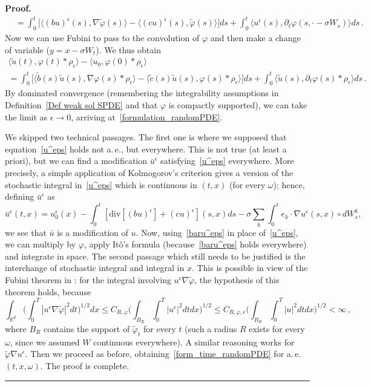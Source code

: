 \documentclass[a4paper,10pt]{article}
\newenvironment{proof}[1][Proof]{\noindent\textbf{#1.} }{\ \rule{0.5em}{0.5em}}
\newcommand{\mr}{\mathbb{R}}
\newcommand{\lan}{\langle}
\newcommand{\ran}{\rangle}
\newcommand{\diverg}{\mathrm{div}}
\newcommand{\td}{\tilde}
\newcommand{\eps}{\epsilon}
\begin{document}
\begin{proof}
\begin{align*}
&= \int^t_0 \big[\lan (b u)^\epsilon(s),\nabla\td{\varphi}(s)\ran-\lan (c u)^\epsilon(s),\td{\varphi}(s)\ran \big] ds+ \int^t_0\lan u^\epsilon(s),\partial_t\varphi(s,\cdot- \sigma W_s)\ran ds \,.
\end{align*}
Now we can use Fubini to pass to the convolution of $\varphi$ and then make a change of variable ($y=x-\sigma W_t$). We thus obtain
\begin{multline}
\label{form_time_randomPDE}
\lan \td{u}(t),\varphi(t)*\rho_\eps\ran-\lan u_0,\varphi(0)*\rho_\eps\ran \\
= \int^t_0 \big[\lan \td{b}(s)\td{u}(s),\nabla\varphi(s)*\rho_\eps\ran-\lan \td{c}(s)\td{u}(s),\varphi(s)*\rho_\eps\ran\big] ds+ \int^t_0\lan \td{u}(s),\partial_t\varphi(s)*\rho_\eps\ran ds \,.
\end{multline}
By dominated convergence (remembering the integrability assumptions in Definition~\ref{Def weak sol SPDE} and that $\varphi$ is compactly supported), we can take the limit as $\eps\rightarrow0$, arriving at~\eqref{formulation_randomPDE}.

We skipped two technical passages. The first one is where we supposed that equation~\eqref{u^eps} holds not a.\,e., but everywhere. This is not true (at least a priori), but we can find a modification $\bar{u}^\eps$ satisfying~\eqref{u^eps} everywhere. More precisely, a simple application of Kolmogorov's criterion gives a version of the stochastic integral in~\eqref{u^eps} which is continuous in $(t,x)$ (for every $\omega$); hence, defining $\bar{u}^\eps$ as
\begin{equation}
\bar{u}^\eps(t,x)= u^\eps_0(x) -\int^t_0[\diverg[(b u)^\eps]+(c u)^\eps](s,x)ds - \sigma\sum_k\int^t_0e_k\cdot\nabla u^\eps(s,x)\circ dW^k_s,\label{baru^eps}
\end{equation}
we see that $\bar{u}$ is a modification of $u$. Now, using~\eqref{baru^eps} in place of~\eqref{u^eps}, we can multiply by $\varphi$, apply It\^o's formula (because~\eqref{baru^eps} holds everywhere) and integrate in space. The second passage which still needs to be justified is the interchange of stochastic integral and integral in $x$. This is possible in view of the Fubini theorem in \cite[Theorem 2.2]{VERAAR12}: for the integral involving $u^\eps\nabla\td{\varphi}$, the hypothesis of this theorem holds, because
\begin{equation*}
\int_{\mr^d}\Big(\int^T_0|u^\eps\nabla\td{\varphi}|^2dt\Big)^{1/2}dx\le C_{R,\varphi}\Big(\int_{B_R}\int^T_0|u^\eps|^2dtdx\Big)^{1/2}\le C_{R,\varphi,\eps}\Big(\int_{B_R}\int^T_0|u|^2dtdx\Big)^{1/2}<\infty \, ,
\end{equation*}
where $B_R$ contains the support of $\td{\varphi}_t$ for every $t$ (such a radius $R$ exists for every $\omega$, since we assumed $W$ continuous everywhere). A similar reasoning works for $\td{\varphi}\nabla u^\eps$. Then we proceed as before, obtaining~\eqref{form_time_randomPDE} for a.\,e.\ $(t,x,\omega)$. The proof is complete.
\end{proof}
\end{document}
